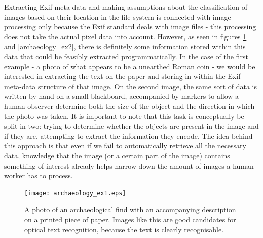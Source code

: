 \documentclass [12pt,a4paper]{report}
\begin{document}
Extracting Exif meta-data and making assumptions about the classification of images based on their location in the file system is connected with image processing only because the Exif standard deals with image files - this processing does not take the actual pixel data into account. However, as seen in figures \ref{archaeology_ex1} and \ref{archaeology_ex2}, there is definitely some information stored within this data that could be feasibly extracted programmatically. In the case of the first example - a photo of what appears to be a unearthed Roman coin - we would be interested in extracting the text on the paper and storing in within the Exif meta-data structure of that image. On the second image, the same sort of data is written by hand on a small blackboard, accompanied by markers to allow a human observer determine both the size of the object and the direction in which the photo was taken. It is important to note that this task is conceptually be split in two: trying to determine whether the objects are present in the image and if they are, attempting to extract the information they encode. The idea behind this approach is that even if we fail to automatically retrieve all the necessary data, knowledge that the image (or a certain part of the image) contains something of interest already helps narrow down the amount of images a human worker has to process.

\begin{center}
\begin{figure}[h]
\centering
\texttt{[image: archaeology\_ex1.eps]} %
\caption{A photo of an archaeological find with an accompanying description on a printed piece of paper. Images like this are good candidates for optical text recognition, because the text is clearly recognisable.}
\label{archaeology_ex1}
\end{figure}
\end{center}
\end{document}
